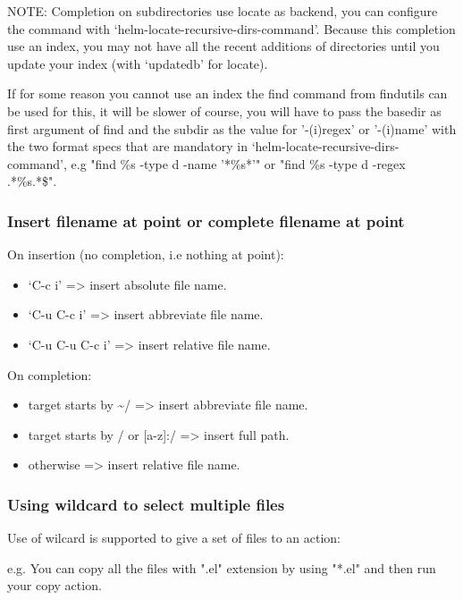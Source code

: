 \documentclass[11pt]{article}
\begin{document}
\begin{enumerate}
NOTE: Completion on subdirectories use locate as backend, you can configure
the command with ‘helm-locate-recursive-dirs-command’.
Because this completion use an index, you may not have all the recent additions
of directories until you update your index (with ‘updatedb’ for locate).

If for some reason you cannot use an index the find command from findutils can be
used for this, it will be slower of course, you will have to pass the basedir as
first argument of find and the subdir as the value for ’-(i)regex’ or ’-(i)name’
with the two format specs that are mandatory in ‘helm-locate-recursive-dirs-command’,
e.g "find \%s -type d -name ’*\%s*’" or "find \%s -type d -regex .*\%s.*\$".
\end{enumerate}

\subsubsection{Insert filename at point or complete filename at point}
\label{sec:orgf20dfc3}

On insertion (no completion, i.e nothing at point):

\begin{itemize}
\item ‘C-c i’         => insert absolute file name.
\item ‘C-u C-c i’     => insert abbreviate file name.
\item ‘C-u C-u C-c i’ => insert relative file name.
\end{itemize}

On completion:

\begin{itemize}
\item target starts by \textasciitilde{}/           => insert abbreviate file name.
\item target starts by / or [a-z]:/ => insert full path.
\item otherwise                     => insert relative file name.
\end{itemize}

\subsubsection{Using wildcard to select multiple files}
\label{sec:org6bb5a72}

Use of wilcard is supported to give a set of files to an action:

e.g. You can copy all the files with ".el" extension by using "*.el"
and then run your copy action.
\end{document}
